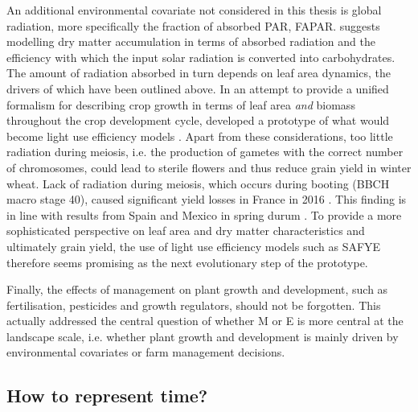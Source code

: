 An additional environmental covariate not considered in this thesis is global radiation, more specifically the fraction of absorbed \gls{PAR}, FAPAR. \cite{monteith_climate_1977} suggests modelling dry matter accumulation in terms of absorbed radiation and the efficiency with which the input solar radiation is converted into carbohydrates. The amount of radiation absorbed in turn depends on leaf area dynamics, the drivers of which have been outlined above. In an attempt to provide a unified formalism for describing crop growth in terms of leaf area \textsl{and} biomass throughout the crop development cycle, \cite{goudriaan_mathematical_1990} developed a prototype of what would become light use efficiency models \citep{gitelson_productivity_2015}. Apart from these considerations, too little radiation during meiosis, i.e. the production of gametes with the correct number of chromosomes, could lead to sterile flowers and thus reduce grain yield in winter wheat. Lack of radiation during meiosis, which occurs during booting (\gls{BBCH} macro stage 40), caused significant yield losses in France in 2016 \citep{le_gouis_how_2020}. This finding is in line with results from Spain and Mexico in spring durum \citep{villegas_daylength_2016}. To provide a more sophisticated perspective on leaf area and dry matter characteristics and ultimately grain yield, the use of light use efficiency models such as \gls{SAFYE} \citep{duchemin_simple_2008, ma_wheat_2022} therefore seems promising as the next evolutionary step of the prototype.

Finally, the effects of management on plant growth and development, such as fertilisation, pesticides and growth regulators, should not be forgotten. This actually addressed the central question of whether M or E is more central at the landscape scale, i.e. whether plant growth and development is mainly driven by environmental covariates or farm management decisions.

\subsection{How to represent time?}

